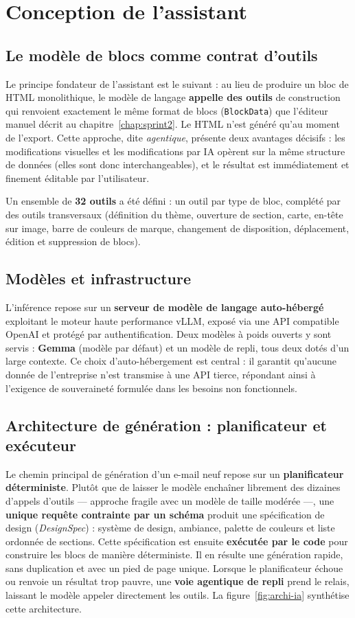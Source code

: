 \section{Conception de l'assistant}

\subsection{Le modèle de blocs comme contrat d'outils}
Le principe fondateur de l'assistant est le suivant : au lieu de produire un
bloc de HTML monolithique, le modèle de langage \textbf{appelle des outils}
de construction qui renvoient exactement le même format de blocs
(\texttt{BlockData}) que l'éditeur manuel décrit au
chapitre~\ref{chap:sprint2}. Le HTML n'est généré qu'au moment de l'export.
Cette approche, dite \emph{agentique}, présente deux avantages décisifs :
les modifications visuelles et les modifications par IA opèrent sur la même
structure de données (elles sont donc interchangeables), et le résultat est
immédiatement et finement éditable par l'utilisateur.

Un ensemble de \textbf{32 outils} a été défini : un outil par type de bloc,
complété par des outils transversaux (définition du thème, ouverture de
section, carte, en-tête sur image, barre de couleurs de marque, changement
de disposition, déplacement, édition et suppression de blocs).

\subsection{Modèles et infrastructure}
L'inférence repose sur un \textbf{serveur de modèle de langage
auto-hébergé} exploitant le moteur haute performance vLLM, exposé via une
API compatible OpenAI et protégé par authentification. Deux modèles à poids
ouverts y sont servis : \textbf{Gemma} (modèle par défaut) et un modèle de
repli, tous deux dotés d'un large contexte. Ce choix d'auto-hébergement est
central : il garantit qu'aucune donnée de l'entreprise n'est transmise à une
API tierce, répondant ainsi à l'exigence de souveraineté formulée dans les
besoins non fonctionnels.

\subsection{Architecture de génération : planificateur et exécuteur}
Le chemin principal de génération d'un e-mail neuf repose sur un
\textbf{planificateur déterministe}. Plutôt que de laisser le modèle
enchaîner librement des dizaines d'appels d'outils — approche fragile avec
un modèle de taille modérée —, une \textbf{unique requête contrainte par un
schéma} produit une spécification de design (\emph{DesignSpec}) : système de
design, ambiance, palette de couleurs et liste ordonnée de sections. Cette
spécification est ensuite \textbf{exécutée par le code} pour construire les
blocs de manière déterministe. Il en résulte une génération rapide, sans
duplication et avec un pied de page unique. Lorsque le planificateur échoue
ou renvoie un résultat trop pauvre, une \textbf{voie agentique de repli}
prend le relais, laissant le modèle appeler directement les outils. La
figure~\ref{fig:archi-ia} synthétise cette architecture.

